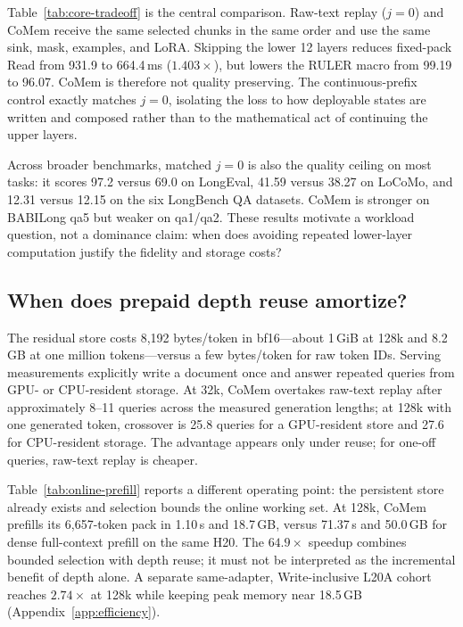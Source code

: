 Table~\ref{tab:core-tradeoff} is the central comparison. Raw-text replay
($j{=}0$) and CoMem receive the same selected chunks in the same order and use
the same sink, mask, examples, and LoRA. Skipping the lower 12 layers reduces
fixed-pack Read from 931.9 to 664.4\,ms ($1.403\times$), but lowers the RULER
macro from 99.19 to 96.07. CoMem is therefore not quality preserving. The
continuous-prefix control exactly matches $j{=}0$, isolating the loss to how
deployable states are written and composed rather than to the mathematical act
of continuing the upper layers.

Across broader benchmarks, matched $j{=}0$ is also the quality ceiling on most
tasks: it scores 97.2 versus 69.0 on LongEval, 41.59 versus 38.27 on LoCoMo,
and 12.31 versus 12.15 on the six LongBench QA datasets. CoMem is stronger on
BABILong qa5 but weaker on qa1/qa2. These results motivate a workload question,
not a dominance claim: when does avoiding repeated lower-layer computation
justify the fidelity and storage costs?

\subsection{When does prepaid depth reuse amortize?}
The residual store costs 8,192 bytes/token in bf16---about 1\,GiB at 128k and
8.2\,GB at one million tokens---versus a few bytes/token for raw token IDs.
Serving measurements explicitly write a document once and answer repeated
queries from GPU- or CPU-resident storage. At 32k, CoMem overtakes raw-text
replay after approximately 8--11 queries across the measured generation
lengths; at 128k with one generated token, crossover is 25.8 queries for a
GPU-resident store and 27.6 for CPU-resident storage. The advantage appears only
under reuse; for one-off queries, raw-text replay is cheaper.



Table~\ref{tab:online-prefill} reports a different operating point: the
persistent store already exists and selection bounds the online working set.
At 128k, CoMem prefills its 6,657-token pack in 1.10\,s and 18.7\,GB, versus
71.37\,s and 50.0\,GB for dense full-context prefill on the same H20. The
$64.9\times$ speedup combines bounded selection with depth reuse; it must not be
interpreted as the incremental benefit of depth alone. A separate same-adapter,
Write-inclusive L20A cohort reaches $2.74\times$ at 128k while keeping peak
memory near 18.5\,GB (Appendix~\ref{app:efficiency}).

